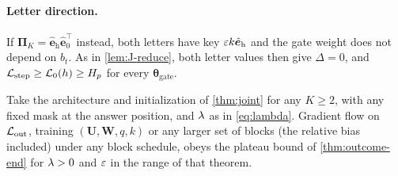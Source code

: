 \paragraph{Letter direction.} If $\bm\Pi_K=\hat{\bm e}_{\mathrm h}\hat{\bm e}_0^\top$ instead, both letters have key $\varepsilon k\hat{\bm e}_{\mathrm h}$ and the gate weight does not depend on $b_t$.
As in \cref{lem:J-reduce}, both letter values then give $\Delta=0$, and $\mathcal L_{\mathrm{step}}\ge \mathcal L_0(h)\ge H_p$ for every $\bm\theta_{\mathrm{gate}}$.

\begin{corollary}
\label{cor:joint-outcome}
Take the architecture and initialization of \cref{thm:joint} for any $K\ge2$, with any fixed mask at the answer position, and $\lambda$ as in
\cref{eq:lambda}. Gradient flow on $\mathcal L_{\mathrm{out}}$, training $(\mathbf U,\mathbf W,q,k)$ or any larger set of blocks (the relative bias included) under any block
schedule, obeys the plateau bound of \cref{thm:outcome-end} for $\lambda>0$ and $\varepsilon$ in the range of that theorem.
\end{corollary}

